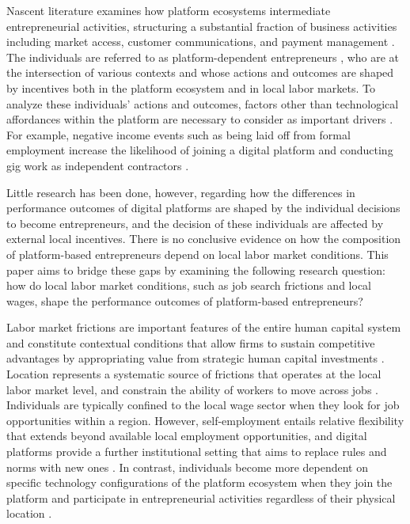 \documentclass[letterpaper,12pt]{article}
\begin{document}
Nascent literature examines how platform ecosystems intermediate entrepreneurial activities, structuring a substantial fraction of business activities including market access, customer communications, and payment management \citep{bearson_measuring_2021,eckhardt_open_2018}. The individuals are referred to as platform-dependent entrepreneurs \citep{cutolo_platform-dependent_2021}, who are at the intersection of various contexts and whose actions and outcomes are shaped by incentives both in the platform ecosystem and in local labor markets. To analyze these individuals’ actions and outcomes, factors other than technological affordances within the platform are necessary to consider as important drivers \citep{nambisan_costs_2021}. For example, negative income events such as being laid off from formal employment increase the likelihood of joining a digital platform and conducting gig work as independent contractors \citep{garin_is_2020,huang_unemployment_2020,jackson_availability_2022,laitenberger2023unemployment}.

Little research has been done, however, regarding how the differences in performance outcomes of digital platforms are shaped by the individual decisions to become entrepreneurs, and the decision of these individuals are affected by external local incentives. There is no conclusive evidence on how the composition of platform-based entrepreneurs depend on local labor market conditions. This paper aims to bridge these gaps by examining the following research question: how do local labor market conditions, such as job search frictions and local wages, shape the performance outcomes of platform-based entrepreneurs?


Labor market frictions are important features of the entire human capital system and constitute contextual conditions that allow firms to sustain competitive advantages by appropriating value from strategic human capital investments \citep{mahoney_market_2013,campbell_bridging_2017,starr_strategic_2018}. Location represents a systematic source of frictions that operates at the local labor market level, and constrain the ability of workers to move across jobs \citep{dahl_home_2012,kim_entrepreneurial_2021}. Individuals are typically confined to the local wage sector when they look for job opportunities within a region. However, self-employment entails relative flexibility that extends beyond available local employment opportunities, and digital platforms provide a further institutional setting that aims to replace rules and norms with new ones \citep{bonina_digital_2021}. In contrast, individuals become more dependent on specific technology configurations of the platform ecosystem when they join the platform and participate in entrepreneurial activities regardless of their physical location \citep{nambisan_digital_2017,autio_digital_2018,cutolo_platform-dependent_2021}.
\end{document}
